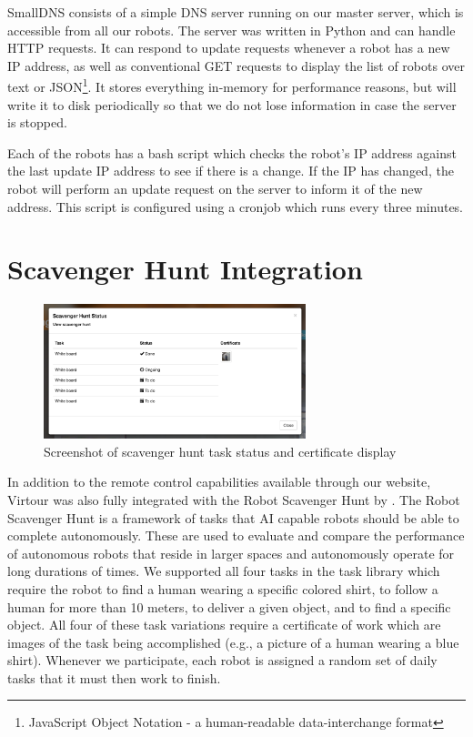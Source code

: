 \documentclass[
  oneside,
  11pt, a4paper,
  footinclude=true,
  headinclude=true,
  cleardoublepage=empty
]{article}
\begin{document}
SmallDNS consists of a simple DNS server running on our master server, which is
accessible from all our robots. The server was written in Python and can
handle HTTP requests. It can respond to update requests whenever a robot has
a new IP address, as well as conventional GET requests to display the list of
robots over text or JSON\footnote{JavaScript Object Notation - a human-readable
data-interchange format}. It stores everything in-memory for performance
reasons, but will write it to disk periodically so that we do not lose
information in case the server is stopped.

Each of the robots has a bash script which checks the robot's IP address against the
last update IP address to see if there is a change. If the IP has changed, the robot
will perform an update request on the server to inform it of the new address. This
script is configured using a cronjob which runs every three minutes.

\section{Scavenger Hunt Integration}\label{sec:scav}

\begin{figure}
  \centering
  \includegraphics[width=3in]{scav_certs}
  \caption{Screenshot of scavenger hunt task status and certificate display}
  \label{fig:scav}
\end{figure}

In addition to the remote control capabilities available through our website,
Virtour was also fully integrated with the Robot Scavenger Hunt
by \citet{zhang2016}.  The Robot Scavenger Hunt is a framework of tasks that AI
capable robots should be able to complete autonomously. These are used to
evaluate and compare the performance of autonomous robots that reside in larger
spaces and autonomously operate for long durations of times. We supported all
four tasks in the task library which require the robot to find a human wearing
a specific colored shirt, to follow a human for more than 10 meters, to deliver
a given object, and to find a specific object. All four of these task
variations require a certificate of work which are images of the task being
accomplished (e.g., a picture of a human wearing a blue shirt). Whenever we
participate, each robot is assigned a random set of daily tasks that it must
then work to finish.
\end{document}
